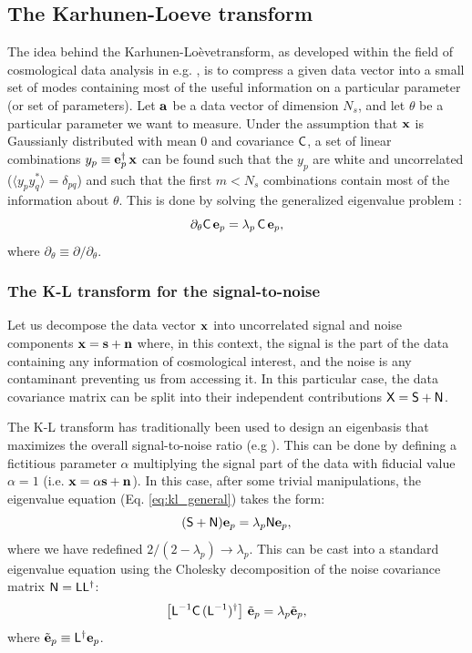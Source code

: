 \documentclass[twocolumn,amsfont,amssymb,amsmath, showpacs,balancelastpage, nofootinbib]{revtex4-1}
\newcommand{\kalo}{Karhunen-Lo\`{e}ve}
\begin{document}
  \subsection{The Karhunen-Loeve transform}\label{ssec:method.klbasis}
    The idea behind the \kalo transform, as developed within the field of cosmological data analysis in e.g. \cite{1996ApJ...465...34V,1997ApJ...480...22T}, is to compress a given data vector into a small set of modes containing most of the useful information on a particular parameter (or set of parameters). Let ${\bf a}$ be a data vector of dimension $N_s$, and let $\theta$ be a particular parameter we want to measure. Under the assumption that ${\bf x}$ is Gaussianly distributed with mean 0 and covariance ${\sf C}$, a set of linear combinations $y_p\equiv{\bf e}_p^\dag\,{\bf x}$ can be found such that the $y_p$ are white and uncorrelated ($\langle y_py_q^*\rangle=\delta_{pq}$) and such that the first $m<N_s$ combinations contain most of the information about $\theta$. This is done by solving the generalized eigenvalue problem \cite{1997ApJ...480...22T}:
    \begin{equation}\label{eq:kl_general}
      \partial_\theta{\sf C}\,{\bf e}_p=\lambda_p\,{\sf C}\,{\bf e}_p,
    \end{equation}
    where $\partial_\theta\equiv\partial/\partial_\theta$.
    
    \subsubsection{The K-L transform for the signal-to-noise}\label{sssec:method.klbasis.sn}
      Let us decompose the data vector ${\bf x}$ into uncorrelated signal and noise components ${\bf x}={\bf s}+{\bf n}$ where, in this context, the signal is the part of the data containing any information of cosmological interest, and the noise is any contaminant preventing us from accessing it. In this particular case, the data covariance matrix can be split into their independent contributions ${\sf X}={\sf S}+{\sf N}$.
      
      The K-L transform has traditionally been used to design an eigenbasis that maximizes the overall signal-to-noise ratio (e.g \cite{1995PhRvL..74.4369B,1996ApJ...465...34V}). This can be done by defining a fictitious parameter $\alpha$ multiplying the signal part of the data with fiducial value $\alpha=1$ (i.e. ${\bf x}=\alpha{\bf s}+{\bf n}$). In this case, after some trivial manipulations, the eigenvalue equation (Eq. \ref{eq:kl_general}) takes the form:
      \begin{equation}\label{eq:kl_sn}
        ({\sf S}+{\sf N}){\bf e}_p=\lambda_p{\sf N}{\bf e}_p,
      \end{equation}
      where we have redefined $2/(2-\lambda_p)\rightarrow\lambda_p$. This can be cast into a standard eigenvalue equation using the Cholesky decomposition of the noise covariance matrix ${\sf N}={\sf L}{\sf L}^\dag$:
      \begin{equation}\label{eq:kl_sn_st}
        \left[{\sf L}^{-1}{\sf C}\,({\sf L}^{-1})^\dag\right]\,\tilde{\bf e}_p=\lambda_p\tilde{\bf e}_p,
      \end{equation}
      where $\tilde{\bf e}_p\equiv{\sf L}^\dag{\bf e}_p$.
      
\end{document}
